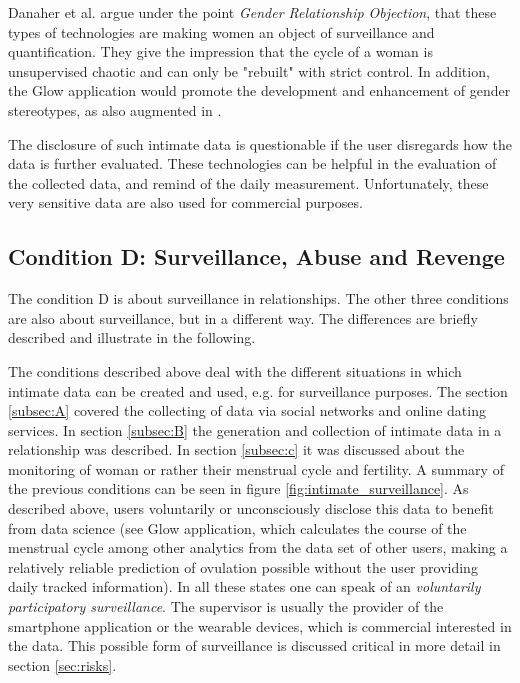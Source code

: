 Danaher et al. \cite{doi:10.1080/15265161.2017.1409823} argue under the point \textit{Gender Relationship Objection}, that these types of technologies are making women an object of surveillance and quantification.
They give the impression that the cycle of a woman is unsupervised chaotic and can only be "rebuilt" with strict control.
In addition, the Glow application would promote the development and enhancement of gender stereotypes, as also augmented in \cite{doi:10.1080/13691058.2014.920528}.
 
The disclosure of such intimate data is questionable if the user disregards how the data is further evaluated. These technologies can be helpful in the evaluation of the collected data, and remind of the daily measurement. Unfortunately, these very sensitive data are also used for commercial purposes.

\subsection{Condition D: Surveillance, Abuse and Revenge}
\label{subsec:D}
The condition D is about surveillance in relationships. The other three conditions are also about surveillance, but in a different way. The differences are briefly described and illustrate in the following.
 
The conditions described above deal with the different situations in which intimate data can be created and used, e.g. for surveillance purposes.
The section \ref{subsec:A} covered the collecting of data via social networks and online dating services. In section \ref{subsec:B} the generation and collection of intimate data in a relationship was described. In section \ref{subsec:c} it was discussed about the monitoring of woman or rather their menstrual cycle and fertility.
A summary of the previous conditions can be seen in figure \ref{fig:intimate_surveillance}.
As described above, users voluntarily or unconsciously disclose this data to benefit from data science (see Glow application, which calculates the course of the menstrual cycle among other analytics from the data set of other users, making a relatively reliable prediction of ovulation possible without the user providing daily tracked information).
In all these states one can speak of an \textit{voluntarily participatory surveillance}.
The supervisor is usually the provider of the smartphone application or the wearable devices, which is commercial interested in the data. This possible form of surveillance is discussed critical in more detail in section \ref{sec:risks}.

